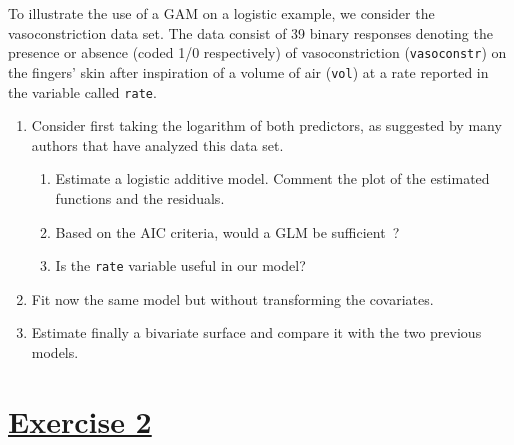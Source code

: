 \documentclass[a4paper,12pt]{article}\usepackage[]{graphicx}\usepackage[]{color}
\begin{document}
To illustrate the use of a GAM on a logistic example, we consider the vasoconstriction data set. The data consist of 39 binary responses denoting the presence or absence (coded 1/0 respectively) of vasoconstriction (\verb"vasoconstr") on the fingers' skin after inspiration of a volume of air (\verb"vol") at a rate reported in the variable called \verb"rate".
\begin{enumerate}[label=\arabic*.]
\item{Consider first taking the logarithm of both predictors, as suggested by many authors that have analyzed this data set.
\begin{enumerate}
\item{Estimate a logistic additive model. Comment the plot of the estimated functions and the residuals.}
\item{Based on the AIC criteria, would a GLM be sufficient~?}
\item{Is the \verb"rate" variable useful in our model?}\end{enumerate}}
\item{Fit now the same model but without transforming the covariates.}
\item{Estimate finally a bivariate surface and compare it with the two previous models.}
\end{enumerate}

\section{\underline{Exercise 2}}
\end{document}
